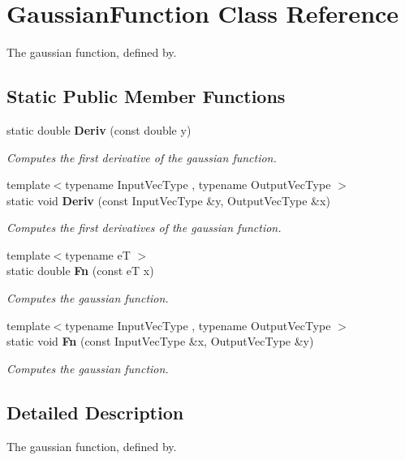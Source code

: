 \section{Gaussian\+Function Class Reference}
\label{classmlpack_1_1ann_1_1GaussianFunction}


The gaussian function, defined by.  


\subsection*{Static Public Member Functions}
\begin{DoxyCompactItemize}
\item 
static double \textbf{ Deriv} (const double y)
\begin{DoxyCompactList}\small\item\em Computes the first derivative of the gaussian function. \end{DoxyCompactList}\item 
{\footnotesize template$<$typename Input\+Vec\+Type , typename Output\+Vec\+Type $>$ }\\static void \textbf{ Deriv} (const Input\+Vec\+Type \&y, Output\+Vec\+Type \&x)
\begin{DoxyCompactList}\small\item\em Computes the first derivatives of the gaussian function. \end{DoxyCompactList}\item 
{\footnotesize template$<$typename eT $>$ }\\static double \textbf{ Fn} (const eT x)
\begin{DoxyCompactList}\small\item\em Computes the gaussian function. \end{DoxyCompactList}\item 
{\footnotesize template$<$typename Input\+Vec\+Type , typename Output\+Vec\+Type $>$ }\\static void \textbf{ Fn} (const Input\+Vec\+Type \&x, Output\+Vec\+Type \&y)
\begin{DoxyCompactList}\small\item\em Computes the gaussian function. \end{DoxyCompactList}\end{DoxyCompactItemize}


\subsection{Detailed Description}
The gaussian function, defined by. 


